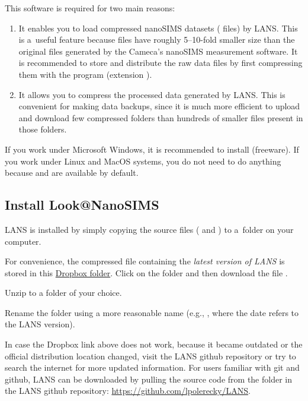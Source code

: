 \goldbox{}
This software is required for two main reasons:

\begin{enumerate}
 
\item It enables you to load compressed nanoSIMS datasets ( files) by LANS. This is a~useful feature because  files have roughly 5--10-fold smaller size than the original  files generated by the Cameca's nanoSIMS measurement software. It is recommended to store and distribute the raw data files by first compressing them with the  program (extension ). 

\item It allows you to compress the processed data generated by LANS. This is convenient for making data backups, since it is much more efficient to upload and download few compressed folders than hundreds of smaller files present in those folders.

\end{enumerate}
\tcbe

\s If you work under Microsoft Windows, it is recommended to install  (freeware). If you work under Linux and MacOS systems, you do not need to do anything because  and  are available by default.


\subsection{Install Look@NanoSIMS}
\setcounter{step}{0}

\goldbox{}
LANS is installed by simply copying the source files ( and ) to a~folder on your computer.
\tcbe

\s For convenience, the compressed file containing the \emph{latest version of LANS} is stored in this \href{https://www.dropbox.com/sh/gyss2uvv5ggu2vl/AABViAmt9WHryEP_xZBrCG_La?dl=0}{Dropbox folder}. Click on the  folder and then download the file .

\s Unzip  to a folder of your choice.

\s Rename the  folder using a more reasonable name (e.g., , where the date refers to the LANS version).

\nb\bul 
In case the Dropbox link above does not work, because it became outdated or the official distribution location changed, visit the LANS github repository or try to search the internet for more updated information. For users familiar with git and github, LANS can be downloaded by pulling the source code from the  folder in the LANS github repository: \url{https://github.com/lpolerecky/LANS}.

